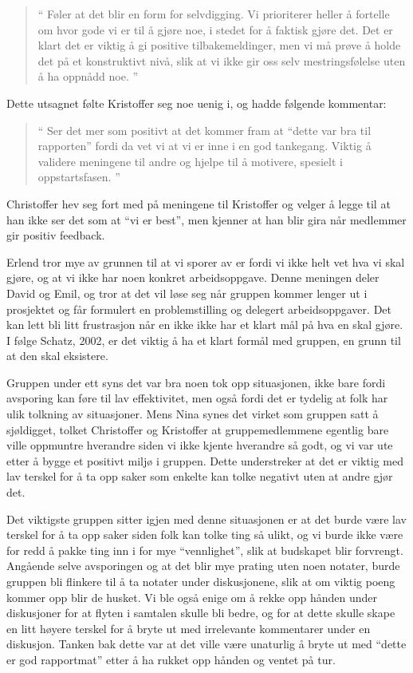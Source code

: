 \begin{quote}``
Føler at det blir en form for selvdigging. Vi prioriterer heller å fortelle om hvor gode vi er til å gjøre noe, i 
stedet for å faktisk gjøre det. Det er klart det er viktig å gi positive tilbakemeldinger, men vi må prøve å holde det på et konstruktivt nivå, slik at vi ikke gir oss selv mestringsfølelse uten å ha oppnådd noe.
''\end{quote} 

Dette utsagnet følte Kristoffer seg noe uenig i, og hadde følgende kommentar:

\begin{quote}``
Ser det mer som positivt at det kommer fram at ``dette 
var bra til rapporten'' fordi da vet vi at vi er inne i en god tankegang. Viktig å validere meningene til andre og hjelpe til å motivere, spesielt i oppstartsfasen. 
''\end{quote}  
Christoffer hev seg fort med på meningene til Kristoffer og velger å legge til at han ikke ser det som at ``vi er best'', men kjenner at han 
blir gira når medlemmer gir positiv feedback. 

Erlend tror mye av grunnen til at vi sporer av er fordi vi ikke helt vet hva vi skal gjøre, og at vi ikke har noen konkret 
arbeidsoppgave. Denne meningen deler David og Emil, og tror at det vil løse seg når gruppen kommer lenger ut i prosjektet og får 
formulert en problemstilling og delegert arbeidsoppgaver. Det kan lett bli litt frustrasjon når en ikke ikke har et klart mål på hva en 
skal gjøre. I følge Schatz, 2002, er det viktig å ha et klart formål med gruppen, en grunn til at den skal eksistere. \cite{Artikkel3}

Gruppen under ett syns det var bra noen tok opp situasjonen, ikke bare fordi avsporing kan føre til lav effektivitet, men også fordi det 
er tydelig at folk har ulik tolkning av situasjoner. Mens Nina synes det virket som gruppen satt å sjøldigget, tolket Christoffer og 
Kristoffer at gruppemedlemmene egentlig bare ville oppmuntre hverandre siden vi ikke kjente hverandre så godt, og vi var ute etter å 
bygge et positivt miljø i gruppen. Dette understreker at det er viktig med lav terskel for å ta opp saker som enkelte kan tolke negativt 
uten at andre gjør det.

Det viktigste gruppen sitter igjen med denne situasjonen er at det burde være lav terskel for å ta opp saker siden folk kan tolke ting så 
ulikt, og vi burde ikke være for redd å pakke ting inn i for mye ``vennlighet'', slik at budskapet blir forvrengt. Angående selve avsporingen 
og at det blir mye prating uten noen notater, burde gruppen bli flinkere til å ta notater under diskusjonene, slik at om viktig poeng 
kommer opp blir de husket. Vi ble også enige om å rekke opp hånden under diskusjoner for at flyten i samtalen skulle bli bedre, og for at dette skulle skape en litt høyere terskel for å bryte ut med irrelevante kommentarer under en diskusjon. Tanken bak dette var at det ville være unaturlig å bryte ut med ``dette er god rapportmat'' etter å ha rukket opp hånden og ventet på tur.

